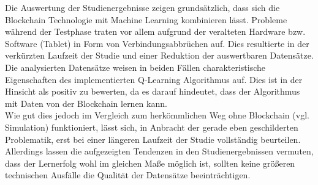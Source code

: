 Die Auswertung der Studienergebnisse zeigen grundsätzlich, dass sich die Blockchain Technologie mit Machine Learning kombinieren lässt. Probleme während der Testphase traten vor allem aufgrund der veralteten Hardware bzw. Software (Tablet) in Form von Verbindungsabbrüchen auf. Dies resultierte in der verkürzten Laufzeit der Studie und einer Reduktion der auswertbaren Datensätze.\\ 
Die analysierten Datensätze weisen in beiden Fällen charakteristische Eigenschaften des implementierten Q-Learning Algorithmus auf. Dies ist in der Hinsicht als positiv zu bewerten, da es darauf hindeutet, dass der Algorithmus mit Daten von der Blockchain lernen kann. \\
Wie gut dies jedoch im Vergleich zum herkömmlichen Weg ohne Blockchain (vgl. Simulation) funktioniert, lässt sich, in Anbracht der gerade eben geschilderten Problematik, erst bei einer längeren Laufzeit der Studie vollständig beurteilen. Allerdings lassen die aufgezeigten Tendenzen in den Studienergebnissen vermuten, dass der Lernerfolg wohl im gleichen Maße möglich ist, sollten keine größeren technischen Ausfälle die Qualität der Datensätze beeinträchtigen.


